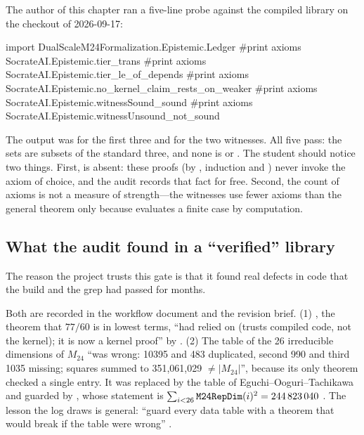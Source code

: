 \begin{example}\label{ex:architecture:audit}
The author of this chapter ran a five-line probe against the compiled library on the
checkout of 2026-09-17:
\begin{leancode}
import DualScaleM24Formalization.Epistemic.Ledger
#print axioms SocrateAI.Epistemic.tier_trans
#print axioms SocrateAI.Epistemic.tier_le_of_depends
#print axioms SocrateAI.Epistemic.no_kernel_claim_rests_on_weaker
#print axioms SocrateAI.Epistemic.witnessSound_sound
#print axioms SocrateAI.Epistemic.witnessUnsound_not_sound
\end{leancode}
The output was  for the first three and \lean{[propext]} for
the two witnesses. All five pass: the sets are subsets of the standard three, and none is
 or . The student should notice two things. First,
 is absent: these proofs (by , induction and
) never invoke the axiom of choice, and the audit records that fact for free.
Second, the
count of axioms is not a measure of strength---the witnesses use fewer axioms than the
general theorem only because  evaluates a finite case by computation.
\end{example}

\subsection{What the audit found in a ``verified'' library}\label{sec:architecture:found}

The reason the project trusts this gate is that it found real defects in code that the
build and the  grep had passed for months.

\begin{historybox}
Both are recorded in the workflow document and the revision brief. (1)
, the theorem that $77/60$ is in lowest terms,
``had relied on  (trusts compiled code, not the kernel); it is now a
kernel proof'' by  . (2) The table  of the
26 irreducible dimensions of $M_{24}$ ``was wrong: 10395 and 483 duplicated, second 990
and third 1035 missing; squares summed to 351,061,029 $\neq |M_{24}|$'', because its only
theorem checked a single entry. It was replaced by the table of Eguchi--Ooguri--Tachikawa
and guarded by , whose statement is
$\sum_{i<26}\texttt{M24RepDim}(i)^2 = 244\,823\,040$ . The lesson the log draws is general: ``guard
every data table with a theorem that would break if the table were wrong''
.
\end{historybox}

